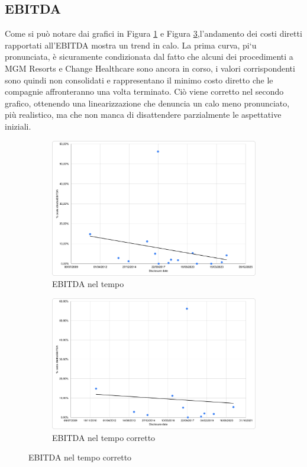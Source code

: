 \documentclass[12pt,a4paper,twoside]{report}
\begin{document}
\subsection{EBITDA}
Come si pu\`o notare dai grafici in Figura \ref{fig:ebit1} e Figura \ref{fig:ebit2},l’andamento dei costi 
diretti rapportati all'EBITDA mostra un trend in calo. 
La prima curva, pi`u pronunciata, \`e sicuramente condizionata dal fatto che alcuni dei procedimenti a 
MGM Resorts e Change Healthcare sono ancora in corso, i valori corrispondenti sono quindi non consolidati e rappresentano 
il minimo costo diretto che le compagnie affronteranno una volta terminato.
 Ci\`o viene corretto nel secondo grafico, ottenendo una linearizzazione che denuncia un calo meno pronunciato, pi\`u realistico,
ma che non manca di disattendere parzialmente le aspettative iniziali.\\
\begin{figure}[H]
    \centering
    \begin{subfigure}{0.48\textwidth}
        \centering
        \includegraphics[width=1\linewidth]{figures/ebit-date-1.png}
        \caption{EBITDA nel tempo}
        \label{fig:ebit1}
    \end{subfigure}
    \begin{subfigure}{0.48\textwidth}
        \centering
    \includegraphics[width=1\linewidth]{figures/ebit-date-2.png}
    \caption{EBITDA nel tempo corretto}
    \label{fig:ebit2}
    \end{subfigure}
\end{figure}
\end{document}
